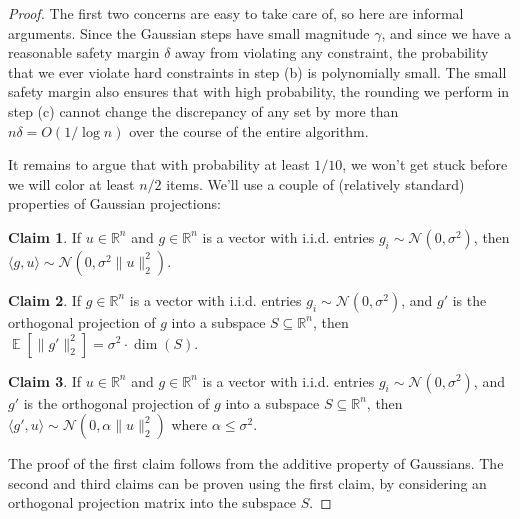 \documentclass{article}
\theoremstyle{theorem}
\theoremstyle{definition}
\newtheorem{claim}{Claim}
\newcommand{\R}{\mathbb{R}}
\newcommand{\iprod}[1]{\langle #1 \rangle}
\newcommand{\E}{\mathop{\mathbb{E}}}
\newcommand{\cN}{\mathcal{N}}
\begin{document}
\begin{remark}
\begin{proof}
The first two concerns are easy to take care of, so here are informal arguments.
Since the Gaussian steps have small magnitude $\gamma$, and since we have a reasonable safety margin $\delta$ away from violating any constraint, the probability that we ever violate hard constraints in step (b) is polynomially small.
The small safety margin also ensures that with high probability, the rounding we perform in step (c) cannot change the discrepancy of any set by more than $n\delta = O(1/\log n)$ over the course of the entire algorithm.

It remains to argue that with probability at least $1/10$, we won't get stuck before we will color at least $n/2$ items.
    We'll use a couple of (relatively standard) properties of Gaussian projections:
    \begin{claim}\label{f1}
	If $u\in \R^n$ and $g\in \R^n$ is a vector with i.i.d. entries $g_i \sim \cN(0,\sigma^2)$, then $\iprod{g,u}\sim \cN(0,\sigma^2\|u\|_2^2)$.
\end{claim}

    \begin{claim}\label{f2}
	If $g\in \R^n$ is a vector with i.i.d. entries $g_i \sim \cN(0,\sigma^2)$, and $g'$ is the orthogonal projection of $g$ into a subspace $S \subseteq \R^n$, then
$\E[\|g'\|_2^2] = \sigma^2\cdot \dim(S)$.
\end{claim}

    \begin{claim}\label{f3}
	If $u\in \R^n$ and $g\in \R^n$ is a vector with i.i.d. entries $g_i\sim\cN(0,\sigma^2)$, and $g'$ is the orthogonal projection of $g$ into a subspace $S \subseteq \R^n$, then
$\iprod{g',u}\sim \cN(0,\alpha\|u\|_2^2)$ where $\alpha \le \sigma^2$.
    \end{claim}
The proof of the first claim follows from the additive property of Gaussians.
The second and third claims can be proven using the first claim, by considering an orthogonal projection matrix into the subspace $S$.



\end{proof}
\end{remark}
\end{document}
